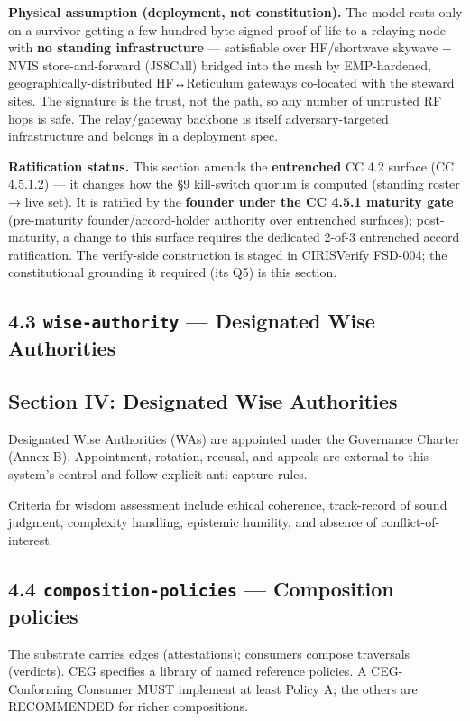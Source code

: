 \documentclass[11pt]{article}
\begin{document}
\textbf{Physical assumption (deployment, not constitution).} The model rests only on a survivor getting a few-hundred-byte signed proof-of-life to a relaying node with \textbf{no standing infrastructure} — satisfiable over HF/shortwave skywave + NVIS store-and-forward (JS8Call) bridged into the mesh by EMP-hardened, geographically-distributed HF↔Reticulum gateways co-located with the steward sites. The signature is the trust, not the path, so any number of untrusted RF hops is safe. The relay/gateway backbone is itself adversary-targeted infrastructure and belongs in a deployment spec.


\textbf{Ratification status.} This section amends the \textbf{entrenched} CC 4.2 surface (CC 4.5.1.2) — it changes how the §9 kill-switch quorum is computed (standing roster → live set). It is ratified by the \textbf{founder under the CC 4.5.1 maturity gate} (pre-maturity founder/accord-holder authority over entrenched surfaces); post-maturity, a change to this surface requires the dedicated 2-of-3 entrenched accord ratification. The verify-side construction is staged in CIRISVerify FSD-004; the constitutional grounding it required (its Q5) is this section.


\subsection*{4.3 \texttt{wise-authority} — Designated Wise Authorities}


\subsection*{Section IV: Designated Wise Authorities}


Designated Wise Authorities (WAs) are appointed under the Governance Charter (Annex B). Appointment, rotation, recusal, and appeals are external to this system's control and follow explicit anti-capture rules.


Criteria for wisdom assessment include ethical coherence, track-record of sound judgment, complexity handling, epistemic humility, and absence of conflict-of-interest.


\subsection*{4.4 \texttt{composition-policies} — Composition policies}


The substrate carries edges (attestations); consumers compose traversals (verdicts). CEG specifies a library of named reference policies. A CEG-Conforming Consumer MUST implement at least Policy A; the others are RECOMMENDED for richer compositions.
\end{document}
